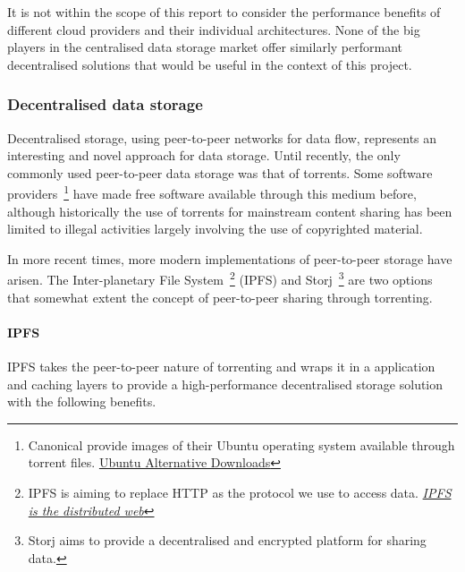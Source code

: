 It is not within the scope of this report to consider the performance benefits of different cloud providers and their individual architectures. None of the big players in the centralised data storage market offer similarly performant decentralised solutions that would be useful in the context of this project.

\subsubsection{Decentralised data storage}

Decentralised storage, using peer-to-peer networks for data flow, represents an interesting and novel approach for data storage. Until recently, the only commonly used peer-to-peer data storage was that of torrents. Some software providers~\footnote{Canonical provide images of their Ubuntu operating system available through torrent files. \href{https://www.ubuntu.com/download/alternative-downloads}{Ubuntu Alternative Downloads}} have made free software available through this medium before, although historically the use of torrents for mainstream content sharing has been limited to illegal activities largely involving the use of copyrighted material.

In more recent times, more modern implementations of peer-to-peer storage have arisen. The Inter-planetary File System~\footnote{IPFS is aiming to replace HTTP as the protocol we use to access data. \href{https://ipfs.io/}{\textit{IPFS is the distributed web}}} (IPFS) and Storj~\footnote{Storj aims to provide a decentralised and encrypted platform for sharing data. } are two options that somewhat extent the concept of peer-to-peer sharing through torrenting.

\paragraph{IPFS}

IPFS takes the peer-to-peer nature of torrenting and wraps it in a application and caching layers to provide a high-performance decentralised storage solution with the following benefits.

